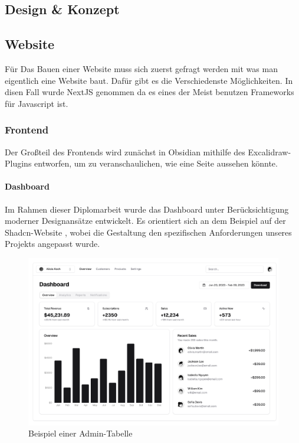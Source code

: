 \begin{inhalt}
\chapter{Design \& Konzept}
\renewcommand*\chapterpagestyle{scrheadings}

\section{Website}

Für Das Bauen einer Website muss sich zuerst gefragt werden mit was man eigentlich eine Website baut. Dafür gibt es die Verschiedenste Möglichkeiten. In disen Fall wurde NextJS genommen da es eines der Meist benutzen Frameworks \cite{SurveyStackOverflow} für Javascript ist.

\subsection{Frontend}
Der Großteil des Frontends wird zunächst in Obsidian mithilfe des Excalidraw-Plugins entworfen, um zu veranschaulichen, wie eine Seite aussehen könnte.

\subsubsection{Dashboard}

Im Rahmen dieser Diplomarbeit wurde das Dashboard unter Berücksichtigung moderner Designansätze entwickelt. Es orientiert sich an dem Beispiel auf der Shadcn-Website \cite{ShadCNDashboard}, wobei die Gestaltung den spezifischen Anforderungen unseres Projekts angepasst wurde.

\begin{figure}[!htb] 
\centering 
\includegraphics[width=1\textwidth]{files/Thomas/pics/Design-Grundlagen/Frontend/Dashboard/dashboard.png} 
\caption[Bildbezeichnung für Abbildungsverzeichnis]{Beispiel einer Admin-Tabelle} 
\label{fig:gehaeuse_internet_bild} 
\end{figure}


\end{inhalt}
